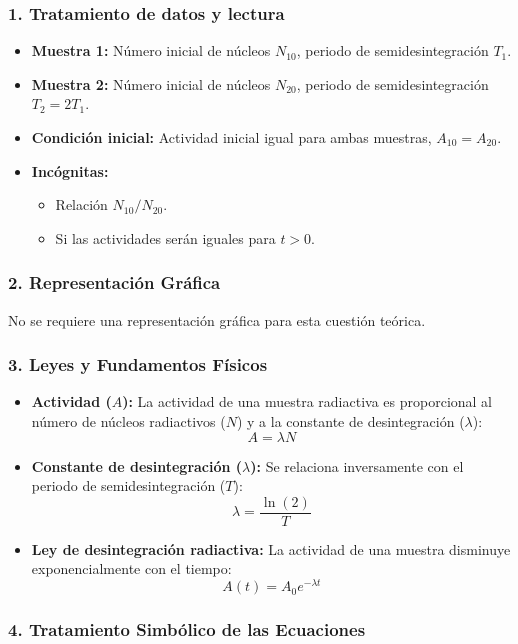 \subsubsection*{1. Tratamiento de datos y lectura}
\begin{itemize}
    \item \textbf{Muestra 1:} Número inicial de núcleos $N_{10}$, periodo de semidesintegración $T_1$.
    \item \textbf{Muestra 2:} Número inicial de núcleos $N_{20}$, periodo de semidesintegración $T_2 = 2T_1$.
    \item \textbf{Condición inicial:} Actividad inicial igual para ambas muestras, $A_{10} = A_{20}$.
    \item \textbf{Incógnitas:}
        \begin{itemize}
            \item Relación $N_{10}/N_{20}$.
            \item Si las actividades serán iguales para $t > 0$.
        \end{itemize}
\end{itemize}

\subsubsection*{2. Representación Gráfica}
No se requiere una representación gráfica para esta cuestión teórica.

\subsubsection*{3. Leyes y Fundamentos Físicos}
\begin{itemize}
    \item \textbf{Actividad ($A$):} La actividad de una muestra radiactiva es proporcional al número de núcleos radiactivos ($N$) y a la constante de desintegración ($\lambda$):
    $$A = \lambda N$$
    \item \textbf{Constante de desintegración ($\lambda$):} Se relaciona inversamente con el periodo de semidesintegración ($T$):
    $$\lambda = \frac{\ln(2)}{T}$$
    \item \textbf{Ley de desintegración radiactiva:} La actividad de una muestra disminuye exponencialmente con el tiempo:
    $$A(t) = A_0 e^{-\lambda t}$$
\end{itemize}

\subsubsection*{4. Tratamiento Simbólico de las Ecuaciones}
